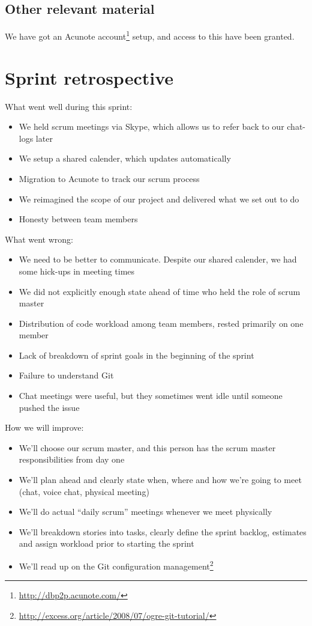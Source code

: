 \documentclass[a4paper,11pt]{article}
\begin{document}
\subsection{Other relevant material}
We have got an Acunote account\footnote{\url{http://dbp2p.acunote.com/}} setup, and access to this have been granted.

\clearpage
\section{Sprint retrospective}

What went well during this sprint:

\begin{itemize}
	\item We held scrum meetings via Skype, which allows us to refer back to our chat-logs later
	\item We setup a shared calender, which updates automatically
	\item Migration to Acunote to track our scrum process
	\item We reimagined the scope of our project and delivered what we set out to do
	\item Honesty between team members
\end{itemize}

\noindent
What went wrong:

\begin{itemize}
	\item We need to be better to communicate. Despite our shared calender, we had some hick-ups in meeting times
	\item We did not explicitly enough state ahead of time who held the role of scrum master
	\item Distribution of code workload among team members, rested primarily on one member 
	\item Lack of breakdown of sprint goals in the beginning of the sprint
	\item Failure to understand Git 
	\item Chat meetings were useful, but they sometimes went idle until someone pushed the issue
\end{itemize}

\noindent
How we will improve:
\begin{itemize}
	\item We'll choose our scrum master, and this person has the scrum master responsibilities from day one
	\item We’ll plan ahead and clearly state when, where and how we’re going to meet (chat, voice chat, physical meeting)
	\item We’ll do actual “daily scrum” meetings whenever we meet physically
	\item We’ll breakdown stories into tasks, clearly define the sprint backlog, estimates and assign workload prior to starting the sprint
	\item We'll read up on the Git configuration management\footnote{\url{http://excess.org/article/2008/07/ogre-git-tutorial/}}
\end{itemize}
\end{document}
